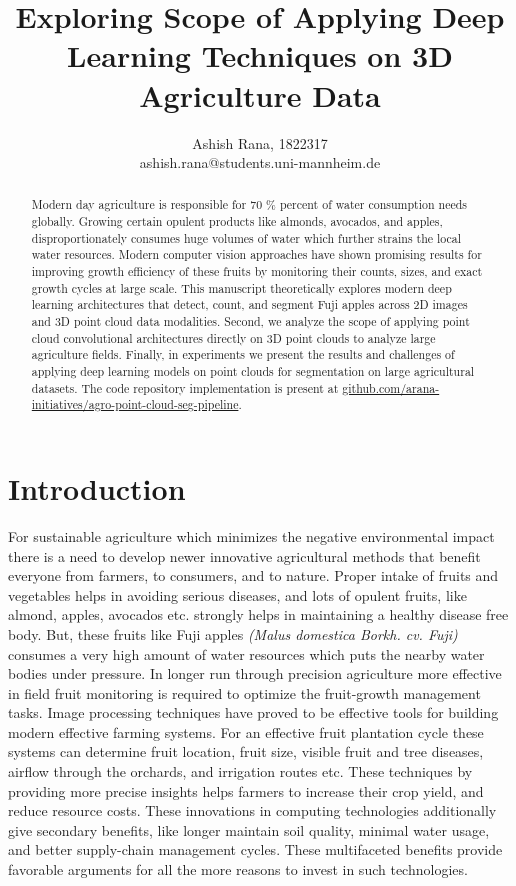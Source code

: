 \documentclass{article}
\title{Exploring Scope of Applying Deep Learning Techniques on 3D Agriculture Data}
\author{Ashish Rana, 1822317 \\
        ashish.rana@students.uni-mannheim.de}
\begin{document}
\maketitle
\tableofcontents %
\newpage


\begin{abstract}


Modern day agriculture is responsible for 70 \% percent of water consumption needs globally.
Growing certain opulent products like almonds, avocados, and apples, disproportionately consumes huge volumes of water which further strains the local water resources.
Modern computer vision approaches have shown promising results for improving growth efficiency of these fruits by monitoring their counts, sizes, and exact growth cycles at large scale.
This manuscript theoretically explores modern deep learning architectures that detect, count, and segment Fuji apples across 2D images and 3D point cloud data modalities.
Second, we analyze the scope of applying point cloud convolutional architectures directly on 3D point clouds to analyze large agriculture fields.
Finally, in experiments we present the results and challenges of applying deep learning models on point clouds for segmentation on large agricultural datasets.
The code repository implementation is present at \href{https://github.com/arana-initiatives/agro-point-cloud-seg-pipeline}{github.com/arana-initiatives/agro-point-cloud-seg-pipeline}.


\end{abstract}


\section{Introduction}


For sustainable agriculture which minimizes the negative environmental impact there is a need to develop newer innovative agricultural methods that benefit everyone from farmers, to consumers, and to nature.
Proper intake of fruits and vegetables helps in avoiding serious diseases, and lots of opulent fruits, like almond, apples, avocados etc. strongly helps in maintaining a healthy disease free body.
But, these fruits like Fuji apples \textit{(Malus domestica Borkh. cv. Fuji)} consumes a very high amount of water resources which puts the nearby water bodies under pressure.
In longer run through precision agriculture more effective in field fruit monitoring is required to optimize the fruit-growth management tasks.
Image processing techniques have proved to be effective tools for building modern effective farming systems. 
For an effective fruit plantation cycle these systems can determine fruit location, fruit size, visible fruit and tree diseases, airflow through the orchards, and irrigation routes etc. \cite{fu2020application, koirala2019deep}
These techniques by providing more precise insights helps farmers to increase their crop yield, and reduce resource costs.
These innovations in computing technologies additionally give secondary benefits, like longer maintain soil quality, minimal water usage, and better supply-chain management cycles.
These multifaceted benefits provide favorable arguments for all the more reasons to invest in such technologies.
\end{document}
